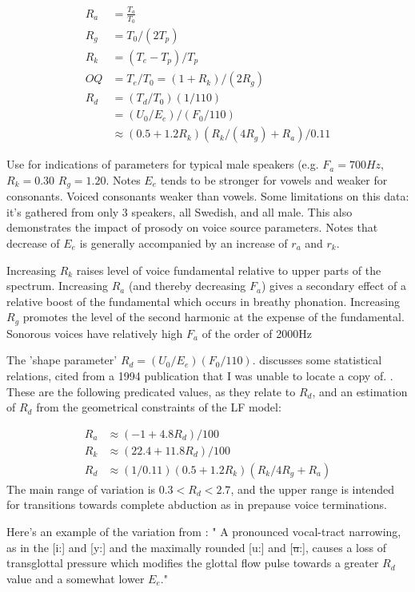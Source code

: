 \begin{align}
R_a & = \frac{T_a}{T_0} \\
R_g & = T_0/(2T_p) \\
R_k & = (T_e - T_p)/T_p \\
OQ & = T_e/T_0 = (1+R_k)/(2R_g) \\
R_d &= (T_d/T_0)(1/110) \\
&= (U_0/E_e)/(F_0/110) \\
& \approx (0.5 + 1.2R_k)(R_k/(4R_g) + R_a)/0.11
\end{align}

Use \cite{Gobl1988} for indications of parameters for typical male speakers (e.g. $F_a = \si{700 Hz} $, $R_k = 0.30$ $R_g=1.20$. Notes $E_e$ tends to be stronger for vowels and weaker for consonants. Voiced consonants weaker than vowels. Some limitations on this data: it's gathered from only 3 speakers, all Swedish, and all male. This also demonstrates the impact of prosody on voice source parameters. Notes that decrease of $E_e$ is generally accompanied by an increase of $r_a$ and $r_k$.

Increasing $R_k$ raises level of voice fundamental relative to upper parts of the spectrum. Increasing $R_a$ (and thereby decreasing $F_a$) gives a secondary effect of a relative boost of the fundamental which occurs in breathy phonation. Increasing $R_g$ promotes the level of the second harmonic at the expense of the fundamental. Sonorous voices have relatively high $F_a$ of the order of \si{2000Hz} \cite{Fant1995}

The 'shape parameter' $R_d = (U_0/E_e)(F_0/110)$.  \cite{Fant1995} discusses some statistical relations, cited from  a 1994 publication that I was unable to locate a copy of. \cite{Fant1994}. These are the following predicated values, as they relate to $R_d$, and an estimation of $R_d$ from the geometrical constraints of the LF model:

\begin{align}
R_a & \approx (-1+4.8R_d)/100 \\
R_k  & \approx (22.4 + 11.8R_d)/100 \\
R_d & \approx (1/0.11)(0.5+1.2R_k)(R_k/4R_g+R_a)
\end{align}
The main range of variation is $0.3 < R_d < 2.7$, and the upper range is intended for transitions towards complete abduction as in prepause voice terminations.

Here's an example of the variation from \cite{Fant1995}: "
A pronounced vocal-tract narrowing, as in the [i:] and [y:] and the maximally rounded [u:] and [\sout{u}:], causes a loss of transglottal pressure which modifies the glottal flow pulse towards a greater $R_d$ value and a somewhat lower $E_e$."

